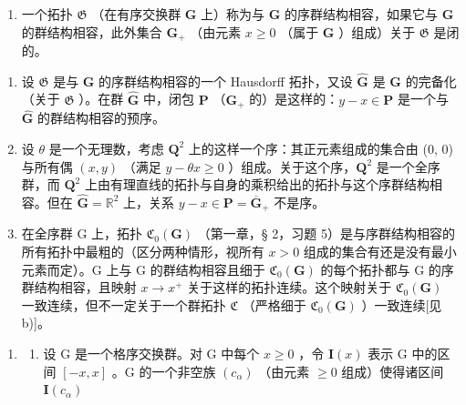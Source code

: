 \BourbakiExercises
\BourbakiExerciseGroup

\begin{enumerate}
\def\labelenumi{\arabic{enumi})}
\tightlist
\item
  一个拓扑 \(\mathfrak{G}\) （在有序交换群 \(\mathbf{G}\) 上）称为与 \(\mathbf{G}\) 的序群结构相容，如果它与 \(\mathbf{G}\) 的群结构相容，此外集合 \(\mathbf{G}_{+}\) （由元素 \(x \geqslant 0\) （属于 \(\mathbf{G}\) ）组成）关于 \(\mathfrak{G}\) 是闭的。
\end{enumerate}

\begin{enumerate}
\def\labelenumi{\alph{enumi})}
\item
  设 \(\mathfrak{G}\) 是与 \(\mathbf{G}\) 的序群结构相容的一个 Hausdorff 拓扑，又设 \(\hat{\mathbf{G}}\) 是 \(\mathbf{G}\) 的完备化（关于 \(\mathfrak{G}\) ）。在群 \(\hat{\mathbf{G}}\) 中，闭包 \(\mathbf{P}\) （\(\mathbf{G}_{+}\) 的）是这样的：\(y - x \in \mathbf{P}\) 是一个与 \(\hat{\mathbf{G}}\) 的群结构相容的预序。
\item
  设 \(\theta\) 是一个无理数，考虑 \(\mathbf{Q}^2\) 上的这样一个序：其正元素组成的集合由 (0, 0) 与所有偶 \((x, y)\) （满足 \(y - \theta x \geqslant 0\) ）组成。关于这个序，\(\mathbf{Q}^2\) 是一个全序群，而 \(\mathbf{Q}^2\) 上由有理直线的拓扑与自身的乘积给出的拓扑与这个序群结构相容。但在 \(\hat{\mathbf{G}} = \mathbb{R}^2\) 上，关系 \(y - x \in \mathbf{P} = \overline{\mathbf{G}}_+\) 不是序。
\item
  在全序群 G 上，拓扑 \(\mathfrak{C}_{0}(\mathbf{G})\) （第一章，§ 2，习题 5）是与序群结构相容的所有拓扑中最粗的（区分两种情形，视所有 \(x > 0\) 组成的集合有还是没有最小元素而定）。G 上与 G 的群结构相容且细于 \(\mathfrak{C}_{0}(\mathbf{G})\) 的每个拓扑都与 G 的序群结构相容，且映射 \(x \to x^{+}\) 关于这样的拓扑连续。这个映射关于 \(\mathfrak{C}_{0}(\mathbf{G})\) 一致连续，但不一定关于一个群拓扑 \(\mathfrak{C}\) （严格细于 \(\mathfrak{C}_{0}(\mathbf{G})\) ）一致连续{[}见 b){]}。
\end{enumerate}

\begin{enumerate}
\def\labelenumi{\arabic{enumi})}
\setcounter{enumi}{1}
\tightlist
\item
  \begin{enumerate}
  \def\labelenumii{\alph{enumii})}
  \tightlist
  \item
    设 G 是一个格序交换群。对 G 中每个 \(x \geqslant 0\) ，令 \(\mathbf{I}(x)\) 表示 G 中的区间 \([-x, x]\) 。G 的一个非空族 \((c_{\alpha})\) （由元素 \(\geqslant 0\) 组成）使得诸区间 \(\mathbf{I}(c_{\alpha})\)
  \end{enumerate}
\end{enumerate}

